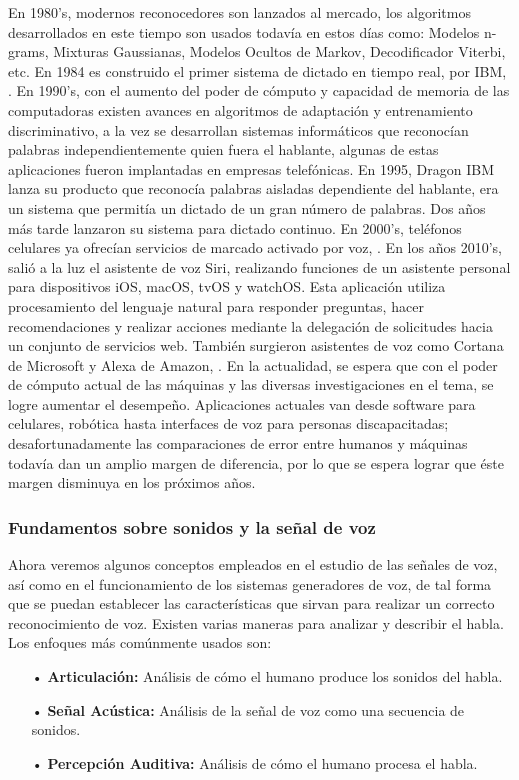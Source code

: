 \vskip 0.5cm
En 1980’s, modernos reconocedores son lanzados al mercado, los algoritmos desarrollados en este tiempo son usados todavía en estos días como: Modelos n-grams, Mixturas Gaussianas, Modelos Ocultos de Markov, Decodificador Viterbi, etc. En 1984 es construido el primer sistema de dictado en tiempo real, por IBM, \citep{orlando}.
\vskip 0.5cm
En 1990’s, con el aumento del poder de cómputo y capacidad de memoria de las computadoras existen avances en algoritmos de adaptación y entrenamiento discriminativo, a la vez se desarrollan sistemas informáticos que reconocían palabras independientemente quien fuera el hablante, algunas de estas aplicaciones fueron implantadas en empresas telefónicas. En 1995, Dragon IBM lanza su producto que reconocía palabras aisladas dependiente del hablante, era un sistema que permitía un dictado de un gran número de palabras. Dos años más tarde lanzaron su sistema para dictado continuo. En 2000’s, teléfonos celulares ya ofrecían servicios de marcado activado por voz, \citep{orlando}.
\vskip 0.5cm
En los años 2010’s, salió a la luz el asistente de voz Siri, realizando funciones de un asistente personal para dispositivos iOS, macOS, tvOS y watchOS. Esta aplicación utiliza procesamiento del lenguaje natural para responder preguntas, hacer recomendaciones y realizar acciones mediante la delegación de solicitudes hacia un conjunto de servicios web. También surgieron asistentes de voz como Cortana de Microsoft y Alexa de Amazon, \citep{timetoast2010}.
\vskip 0.5cm
En la actualidad, se espera que con el poder de cómputo actual de las máquinas y las diversas investigaciones en el tema, se logre aumentar el desempeño. Aplicaciones actuales van desde software para celulares, robótica hasta interfaces de voz para personas discapacitadas; desafortunadamente las comparaciones de error entre humanos y máquinas todavía dan un amplio margen de diferencia, por lo que se espera lograr que éste margen disminuya en los próximos años.

\subsubsection{Fundamentos sobre sonidos y la señal de voz}
Ahora veremos algunos conceptos empleados en el estudio de las señales de voz, así como en el funcionamiento de los sistemas generadores de voz, de tal forma que se puedan establecer las características que sirvan para realizar un correcto reconocimiento de voz. Existen varias maneras para analizar y describir el habla. Los enfoques más comúnmente usados son:
\begin{enumerate}
\item[•]\textbf{Articulación:} Análisis de cómo el humano produce los sonidos del habla.
\item[•]\textbf{Señal Acústica:} Análisis de la señal de voz como una secuencia de sonidos.
\item[•]\textbf{Percepción Auditiva:} Análisis de cómo el humano procesa el habla.
\end{enumerate}

